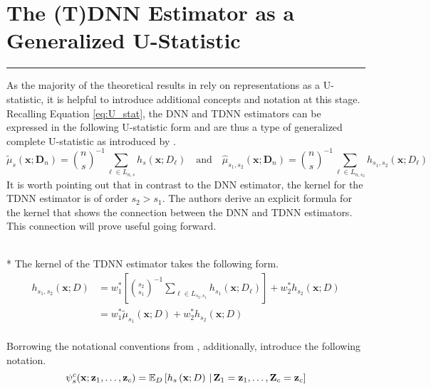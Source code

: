 \section{The (T)DNN Estimator as a Generalized U-Statistic}
\hrule

As the majority of the theoretical results in \citet{demirkaya_optimal_2024} rely on representations as a U-statistic, it is helpful to introduce additional concepts and notation at this stage.
Recalling Equation \ref{eq:U_stat}, the DNN and TDNN estimators can be expressed in the following U-statistic form and are thus a type of generalized complete U-statistic as introduced by \citet{peng_rates_2022}.
\begin{equation}
	\tilde{\mu}_{s}(\mathbf{x}; \mathbf{D}_n)
	= \binom{n}{s}^{-1} \sum_{\ell \in L_{n,s}} h_{s}(\mathbf{x}; D_{\ell})
	\quad \text{and} \quad
	\hat{\mu}_{s_1, s_2}(\mathbf{x}; \mathbf{D}_n)
	= \binom{n}{s}^{-1} \sum_{\ell \in L_{n,s_2}} h_{s_1, s_2}(\mathbf{x}; D_{\ell})
\end{equation}
It is worth pointing out that in contrast to the DNN estimator, the kernel for the TDNN estimator is of order $s_2 > s_1$.
The authors derive an explicit formula for the kernel that shows the connection between the DNN and TDNN estimators.
This connection will prove useful going forward.
\begin{boxD}
	\begin{lem}\label{lem:dem8}\mbox{}\\*
		The kernel of the TDNN estimator takes the following form.
		\begin{equation}
			\begin{aligned}
				h_{s_1, s_2}\left(\mathbf{x}; D\right)
				 & = w_{1}^{*}\left[\binom{s_2}{s_1}^{-1}\sum_{\ell \in L_{s_2, s_1}} h_{s_1}\left(\mathbf{x}; D_{\ell}\right)\right] + w_{2}^{*} h_{s_2}\left(\mathbf{x}; D\right) \\
				 & = w_{1}^{*} \tilde{\mu}_{s_1}\left(\mathbf{x}; D\right) + w_{2}^{*} h_{s_2}\left(\mathbf{x}; D\right)                                                            \\
			\end{aligned}
		\end{equation}
	\end{lem}
\end{boxD}
Borrowing the notational conventions from \citet{lee_u-statistics_2019}, additionally, introduce the following notation.
\begin{equation}\label{eq:psi_s_c}
	\psi_{s}^{c}(\mathbf{x}; \mathbf{z}_{1}, \dotsc, \mathbf{z}_{c})
	= \mathbb{E}_{D}\left[h_{s}\left(\mathbf{x}; D\right) \, | \,  \mathbf{Z}_1 = \mathbf{z}_{1}, \dotsc, \mathbf{Z}_c = \mathbf{z}_{c}\right]
\end{equation}
